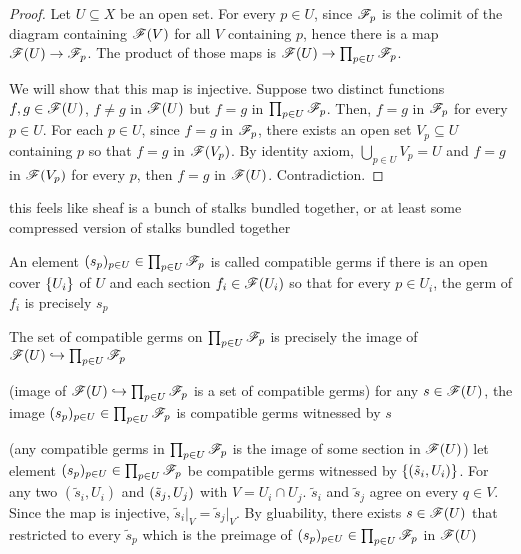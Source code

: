 \begin{proof}
	Let $U \subseteq X$ be an open set. For every $p \in U$, since $\mathscr{F}_p$ is the colimit of the diagram containing $\mathscr{F}(V)$ for all $V$ containing $p$, hence there is a map $\mathscr{F}(U) \to \mathscr{F}_p$. The product of those maps is $\mathscr{F}(U) \to \prod_{p \in U} \mathscr{F}_p$.
	
	We will show that this map is injective. Suppose two distinct functions $f, g \in \mathscr{F}(U)$, $f \neq g$ in $\mathscr{F}(U)$ but $f = g$ in $\prod_{p \in U} \mathscr{F}_p$. Then, $f = g$ in $\mathscr{F}_p$ for every $p \in U$. For each $p \in U$, since $f = g$ in $\mathscr{F}_p$, there exists an open set $V_p \subseteq U$ containing $p$ so that $f = g$ in $\mathscr{F}(V_p)$. By identity axiom, $\bigcup_{p \in U} V_p = U$ and $f = g$ in $\mathscr{F}(V_p)$ for every $p$, then $f = g$ in $\mathscr{F}(U)$. Contradiction.
\end{proof}

\begin{remark}
	this feels like sheaf is a bunch of stalks bundled together, or at least some compressed version of stalks bundled together
\end{remark}

\begin{definition}
	An element $(s_p)_{p \in U} \in \prod_{p \in U} \mathscr{F}_p$ is called compatible germs if there is an open cover $\{U_i\}$ of $U$ and each section $f_i \in \mathscr{F}(U_i)$ so that for every $p \in U_i$, the germ of $f_i$ is precisely $s_p$
\end{definition}

\begin{proposition}
	The set of compatible germs on $\prod_{p \in U} \mathscr{F}_p$ is precisely the image of $\mathscr{F}(U) \hookrightarrow \prod_{p \in U} \mathscr{F}_p$
\end{proposition}

\begin{longproof}
	(image of $\mathscr{F}(U) \hookrightarrow \prod_{p \in U} \mathscr{F}_p$ is a set of compatible germs) for any $s \in \mathscr{F}(U)$, the image $(s_p)_{p \in U} \in \prod_{p \in U} \mathscr{F}_p$ is compatible germs witnessed by $s$
	
	(any compatible germs in $\prod_{p \in U} \mathscr{F}_p$ is the image of some section in $\mathscr{F}(U)$) let element $(s_p)_{p \in U} \in \prod_{p \in U} \mathscr{F}_p$ be compatible germs witnessed by $\{(\tilde{s}_i, U_i)\}$. For any two $(\tilde{s}_i, U_i)$ and $(\tilde{s}_j, U_j)$ with $V = U_i \cap U_j$. $\tilde{s}_i$ and $\tilde{s}_j$ agree on every $q \in V$. Since the map is injective, $\tilde{s}_i \vert_{V} = \tilde{s}_j \vert_V$. By gluability, there exists $s \in \mathscr{F}(U)$ that restricted to every $\tilde{s}_p$ which is the preimage of $(s_p)_{p \in U} \in \prod_{p \in U} \mathscr{F}_p$ in $\mathscr{F}(U)$
\end{longproof}


